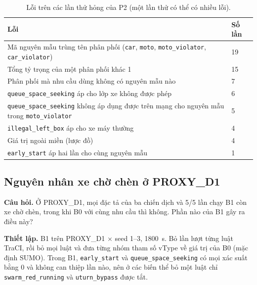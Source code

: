\documentclass[../main.tex]{subfiles}
\begin{document}
\begin{table}[H]
\centering
\small
\caption{Lỗi trên các lần thử hỏng của P2 (một lần thử có thể có nhiều lỗi).} \label{table:4.qwen_errors}
\begin{tabular}{|p{11.0cm}|p{1.8cm}|}
\hline
\textbf{Lỗi} & \textbf{Số lần} \\ \hline
Mã nguyên mẫu trùng tên phân phối (\texttt{car}, \texttt{moto}, \texttt{moto\_violator}, \texttt{car\_violator}) & 19 \\ \hline
Tổng tỷ trọng của một phân phối khác 1 & 15 \\ \hline
Phân phối mà nhu cầu dùng không có nguyên mẫu nào & 7 \\ \hline
\texttt{queue\_space\_seeking} áp cho lớp xe không được phép & 6 \\ \hline
\texttt{queue\_space\_seeking} không áp dụng được trên mạng cho nguyên mẫu trong \texttt{moto\_violator} & 5 \\ \hline
\texttt{illegal\_left\_box} áp cho xe máy thường & 4 \\ \hline
Giá trị ngoài miền (lược đồ) & 4 \\ \hline
\texttt{early\_start} áp hai lần cho cùng nguyên mẫu & 1 \\ \hline
\end{tabular}
\end{table}

\subsection{Nguyên nhân xe chờ chèn ở PROXY\_D1}
\label{subsection:d1_backlog}

\textbf{Câu hỏi.} Ở PROXY\_D1, mọi đặc tả của ba chiến dịch và 5/5 lần chạy B1 còn xe chờ chèn, trong khi B0 với cùng nhu cầu thì không. Phần nào của B1 gây ra điều này?

\textbf{Thiết lập.} B1 trên PROXY\_D1 $\times$ seed 1--3, 1800~s. Bỏ lần lượt từng luật TraCI, rồi bỏ mọi luật và đưa từng nhóm tham số vType về giá trị của B0 (mặc định SUMO). Trong B1, \texttt{early\_start} và \texttt{queue\_space\_seeking} có mọi xác suất bằng 0 và không can thiệp lần nào, nên ở các biến thể bỏ một luật chỉ \texttt{swarm\_red\_running} và \texttt{uturn\_bypass} được tắt.
\end{document}
